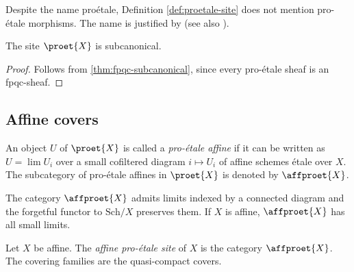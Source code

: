 \begin{remark}
    Despite the name proétale, Definition \ref{def:proetale-site} does not mention pro-étale morphisms.
    The name is justified by  (see also ).
\end{remark}

\begin{proposition}
    The site $\proet{X}$ is subcanonical.
    \label{prop:proet-subcanonical}
    \mathlibok
\end{proposition}

\begin{proof}
    Follows from \ref{thm:fpqc-subcanonical}, since every pro-étale sheaf is an fpqc-sheaf.
\end{proof}

\subsection{Affine covers}

\begin{definition}
    An object $U$ of $\proet{X}$ is called a \emph{pro-étale affine} if it can be written
    as $U = \lim U_i$ over a small cofiltered diagram $i \mapsto U_i$ of affine schemes étale over $X$.
    The subcategory of pro-étale affines in $\proet{X}$ is denoted by $\affproet{X}$.
    \label{def:affproet}
\end{definition}

\begin{lemma}
    The category $\affproet{X}$ admits limits indexed by a connected diagram and the
    forgetful functor to $\mathrm{Sch} / X$ preserves them.
    If $X$ is affine, $\affproet{X}$ has all small limits.
    \label{lemma:affproet-limits}
\end{lemma}

\begin{definition}

\leanok
    Let $X$ be affine. The \emph{affine pro-étale site} of $X$ is the category $\affproet{X}$.
    The covering families are the quasi-compact covers.
    \label{def:affproet-site}
\end{definition}

